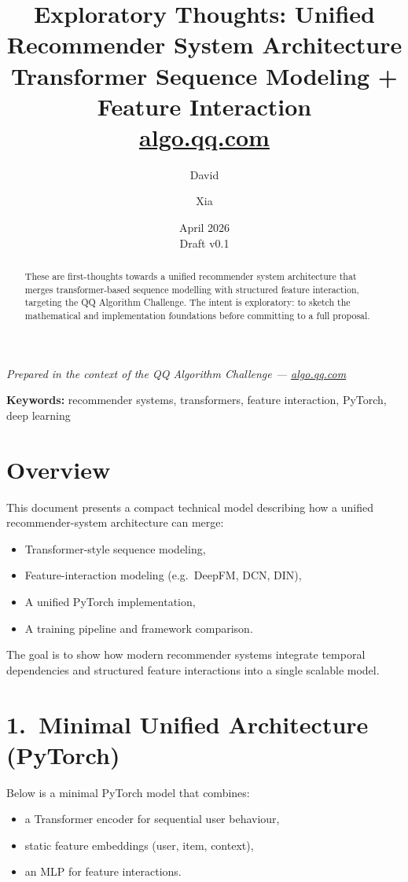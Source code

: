 \documentclass[12pt]{article}
\title{Exploratory Thoughts: Unified Recommender System Architecture\\
\large Transformer Sequence Modeling + Feature Interaction\\
\normalsize \href{https://algo.qq.com/\#intro}{algo.qq.com}}
\author{David \and Xia}
\date{April 2026 \\ \small Draft v0.1}
\begin{document}
\maketitle

\begin{center}
    \small\textit{Prepared in the context of the QQ Algorithm Challenge ---
    \href{https://algo.qq.com/\#intro}{algo.qq.com}}
\end{center}

\begin{abstract}
These are first-thoughts towards a unified recommender system architecture
that merges transformer-based sequence modelling with structured feature
interaction, targeting the QQ Algorithm Challenge. The intent is exploratory:
to sketch the mathematical and implementation foundations before committing to
a full proposal.
\end{abstract}

\noindent\textbf{Keywords:} recommender systems, transformers, feature interaction, PyTorch, deep learning

\bigskip

\section{Overview}
This document presents a compact technical model describing how a unified
recommender-system architecture can merge:
\begin{itemize}
    \item Transformer-style sequence modeling,
    \item Feature-interaction modeling (e.g.\ DeepFM, DCN, DIN),
    \item A unified PyTorch implementation,
    \item A training pipeline and framework comparison.
\end{itemize}

The goal is to show how modern recommender systems integrate temporal
dependencies and structured feature interactions into a single scalable model.

\section{1.\ Minimal Unified Architecture (PyTorch)}
Below is a minimal PyTorch model that combines:
\begin{itemize}
    \item a Transformer encoder for sequential user behaviour,
    \item static feature embeddings (user, item, context),
    \item an MLP for feature interactions.
\end{itemize}
\end{document}
